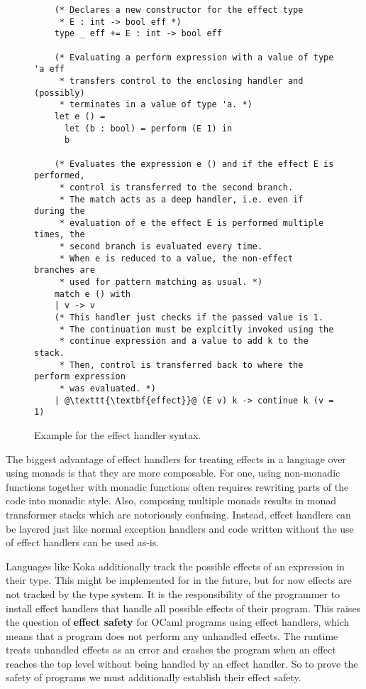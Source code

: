 \begin{figure}[ht]
    \begin{verbatim}
    (* Declares a new constructor for the effect type 
     * E : int -> bool eff *)
    type _ eff += E : int -> bool eff

    (* Evaluating a perform expression with a value of type 'a eff
     * transfers control to the enclosing handler and (possibly)
     * terminates in a value of type 'a. *)
    let e () = 
      let (b : bool) = perform (E 1) in
      b

    (* Evaluates the expression e () and if the effect E is performed,
     * control is transferred to the second branch.
     * The match acts as a deep handler, i.e. even if during the 
     * evaluation of e the effect E is performed multiple times, the
     * second branch is evaluated every time.
     * When e is reduced to a value, the non-effect branches are 
     * used for pattern matching as usual. *)
    match e () with
    | v -> v
    (* This handler just checks if the passed value is 1.
     * The continuation must be explcitly invoked using the 
     * continue expression and a value to add k to the stack.
     * Then, control is transferred back to where the perform expression 
     * was evaluated. *)
    | @\texttt{\textbf{effect}}@ (E v) k -> continue k (v = 1)
\end{verbatim}
    \caption{Example for the effect handler syntax.}
    \label{fig:effect-example}
\end{figure}

The biggest advantage of effect handlers for treating effects in a language over using monads is that they are more composable.
For one, using non-monadic functions together with monadic functions often requires rewriting parts of the code into monadic style.
Also, composing multiple monads results in monad transformer stacks which are notoriously confusing.
Instead, effect handlers can be layered just like normal exception handlers and code written without the use of effect handlers can be used as-is.

Languages like Koka additionally track the possible effects of an expression in their type.
This might be implemented for \ocf{} in the future, but for now effects are not tracked by the type system.
It is the responsibility of the programmer to install effect handlers that handle all possible effects of their program.
This raises the question of \textbf{effect safety} for OCaml programs using effect handlers, which means that a program does not perform any unhandled effects.
The \ocf{} runtime treats unhandled effects as an error and crashes the program when an effect reaches the top level without being handled by an effect handler.
So to prove the safety of \ocf{} programs we must additionally establish their effect safety.

